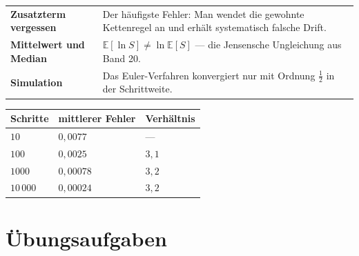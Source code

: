 \begin{warnung}
\begin{center}
{\small
\renewcommand{\arraystretch}{1.52}
\begin{tabular}{@{}P{2.6cm}P{6.0cm}@{}}
\toprule
\textbf{Zusatzterm vergessen} & Der häufigste Fehler: Man wendet die gewohnte Kettenregel an und erhält systematisch falsche Drift.\\
\textbf{Mittelwert und Median} & $\mathbb{E}[\ln S] \ne \ln \mathbb{E}[S]$ --- die Jensensche Ungleichung aus Band 20.\\
\textbf{Simulation} & Das Euler-Verfahren konvergiert nur mit Ordnung $\tfrac12$ in der Schrittweite.\\
\bottomrule
\end{tabular}}
\end{center}

\begin{center}
{\small
\renewcommand{\arraystretch}{1.46}
\begin{tabular}{@{}P{1.8cm}P{2.6cm}P{2.4cm}@{}}
\toprule
\textbf{Schritte} & \textbf{mittlerer Fehler} & \textbf{Verhältnis}\\
\midrule
$10$ & $0{,}0077$ & ---\\
$100$ & $0{,}0025$ & $3{,}1$\\
$1000$ & $0{,}00078$ & $3{,}2$\\
$10\,000$ & $0{,}00024$ & $3{,}2$\\
\bottomrule
\end{tabular}}
\end{center}

\begin{center}
\begin{minipage}{0.88\textwidth}
\end{minipage}
\end{center}
\end{warnung}

\section{Übungsaufgaben}

